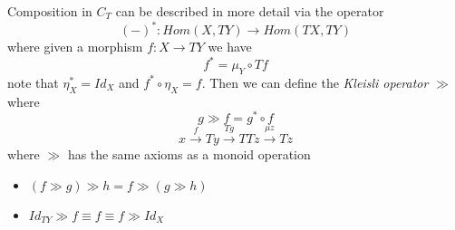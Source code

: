 \documentclass{article}
\theoremstyle{definition}
\begin{document}
Composition in $C_T$ can be described in more detail via the operator
$$(-)^{*} : Hom(X, TY) \rightarrow Hom(TX, TY)$$
where given a morphism $f: X \rightarrow TY$ we have
$$f^{*} = \mu_{Y} \circ Tf$$
note that
$\eta_{X}^{*} = Id_{X}$
and
$f^{*} \circ \eta _{X} = f$.
Then we can define the \textit{Kleisli operator} $\gg$ where
$$g \gg f = g^{*} \circ f$$
\begin{displaymath}
    x
    \stackrel{f}{\rightarrow}     T y
    \stackrel{T g}{\rightarrow}   T T z
    \stackrel{\mu z}{\rightarrow} T z
\end{displaymath}
where $\gg$ has the same axioms as a monoid operation
\begin{itemize}
    \item $(f \gg g) \gg h = f \gg (g \gg h)$
    \item $Id_{TY} \gg f \equiv f \equiv f \gg Id_{X}$
\end{itemize}
\end{document}
